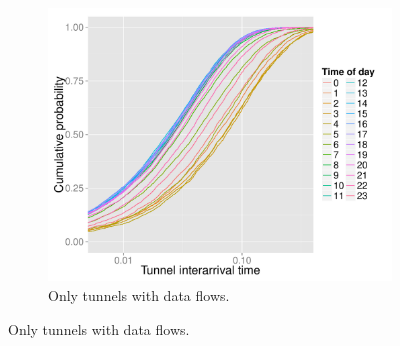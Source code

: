 \begin{figure}[htbp]
{\begin{subfigure}[b]{0.45\paperwidth}
                \includegraphics[width=\textwidth]{images/R-IAT-fromflows-ecdfs-2h.pdf}
                \caption{Only tunnels with data flows.}
                \label{c4:fig:IAT-ecdf-2h-active}
        \end{subfigure}
        }


\end{figure}
